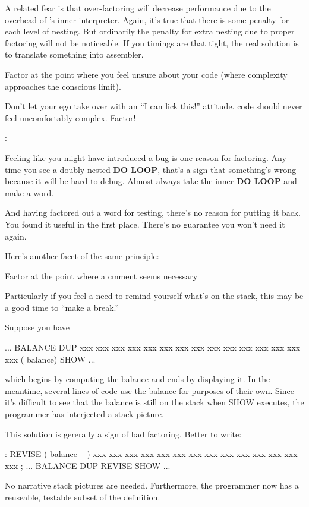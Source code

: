 A related fear is that over-factoring will decrease performance due to the overhead of \Forth{}'s inner interpreter. Again, it's true that there is some penalty for each level of nesting. But ordinarily the penalty for extra nesting due to proper factoring will not be noticeable. If you timings are that tight, the real solution is to translate something into assembler.

\begin{tip}
Factor at the point where you feel unsure about your code (where complexity approaches the conscious limit).
\end{tip}
Don't let your ego take over with an ``I can lick this!'' attitude. \Forth{} code should never feel uncomfortably complex. Factor!

\begin{interview}
:

\begin{tfquot}
Feeling like you might have introduced a bug is one reason for factoring. Any time you see a doubly-nested \textbf{DO LOOP}, that's a sign that something's wrong because it will be hard to debug. Almost always take the inner \textbf{DO LOOP} and make a word.

And having factored out a word for testing, there's no reason for putting it back. You found it useful in the first place. There's no guarantee you won't need it again.
\end{tfquot}
\end{interview}
Here's another facet of the same principle:

\begin{tip}
Factor at the point where a cmment seems necessary
\end{tip}
Particularly if you feel a need to remind yourself what's on the stack, this may be a good time to ``make a break.''

\goodbreak
Suppose you have
\begin{Code}
... BALANCE  DUP xxx xxx xxx xxx xxx xxx xxx xxx xxx
     xxx xxx xxx xxx xxx xxx   ( balance) SHOW  ...
\end{Code}
which begins by computing the balance and ends by displaying it. In the meantime, several lines of code use the balance for purposes of their own. Since it's difficult to see that the balance is still on the stack when SHOW executes, the programmer has interjected a stack picture.

This solution is gererally a sign of bad factoring. Better to write:
\begin{Code}
: REVISE  ( balance -- )  xxx xxx xxx xxx xxx xxx xxx
     xxx xxx xxx xxx xxx xxx xxx ;
... BALANCE  DUP REVISE  SHOW  ...
\end{Code}
No narrative stack pictures are needed. Furthermore, the programmer now has a reuseable, testable subset of the definition.

